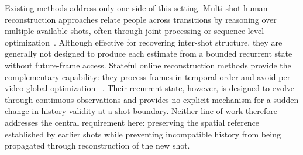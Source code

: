 Existing methods address only one side of this setting. Multi-shot human
reconstruction approaches relate people across transitions by reasoning over
multiple available shots, often through joint processing or sequence-level
optimization~\citep{pavlakos2022multishot,zhang2025humanmm,on2026multithumbs}.
Although effective for recovering inter-shot structure, they are generally
not designed to produce each estimate from a bounded recurrent state without
future-frame access. Stateful online reconstruction methods provide the
complementary capability: they process frames in temporal order and avoid
per-video global optimization
~\citep{wang2025cut3r,chen2026human3r,chen2025long3r}. Their recurrent
state, however, is designed to evolve through continuous observations and
provides no explicit mechanism for a sudden change in history validity at a
shot boundary. Neither line of work therefore addresses the central
requirement here: preserving the spatial reference established by earlier
shots while preventing incompatible history from being propagated through
reconstruction of the new shot.

